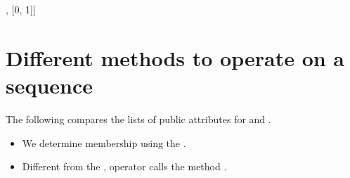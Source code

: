 \documentclass[letterpaper,10pt,english]{sphinxmanual}
\begin{document}
\begin{sphinxVerbatim}[commandchars=\\\{\}]
[[1, 0], [0, 1]]
\end{sphinxVerbatim}


\section{Different methods to operate on a sequence}
\label{\detokenize{Lecture7/Lists and Tuples:different-methods-to-operate-on-a-sequence}}
The following compares the lists of public attributes for  and .
\begin{itemize}
\item {} 
We determine membership using the .

\item {} 
Different from the , operator  calls the method .

\end{itemize}
\end{document}

